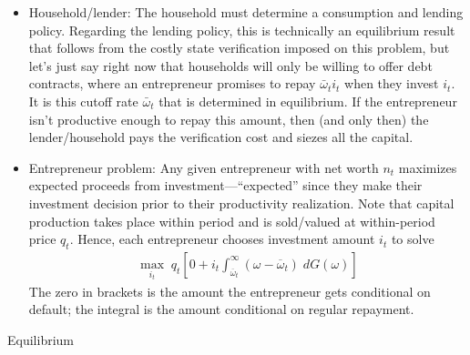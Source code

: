 \documentclass[12pt]{article}
\theoremstyle{plain}
\theoremstyle{definition}
\theoremstyle{remark}
\begin{document}
\begin{itemize}
  \item Household/lender:
    The household must determine a consumption and lending policy.
    Regarding the lending policy, this is technically an equilibrium
    result that follows from the costly state verification imposed on
    this problem, but let's just say right now that households will only
    be willing to offer debt contracts, where an entrepreneur promises
    to repay $\bar{\omega}_ti_t$ when they invest $i_t$. It is this
    cutoff rate $\bar{\omega}_t$ that is determined in equilibrium.
    If the entrepreneur isn't productive enough to repay this amount,
    then (and only then) the lender/household pays the verification cost
    and siezes all the capital.

  \item Entrepreneur problem:
    Any given entrepreneur with net worth $n_t$ maximizes expected
    proceeds from investment---``expected'' since they make their
    investment decision prior to their productivity realization.
    Note that capital production takes place within period and is
    sold/valued at within-period price $q_t$.
    Hence, each entrepreneur chooses investment amount $i_t$ to solve
    \begin{align*}
      \max_{i_t}
      \;
      q_t
      \left[
      0 +
      i_t\int_{\overline{\omega}_t}^\infty
      (\omega-\overline{\omega}_t)\;dG(\omega)
      \right]
    \end{align*}
    The zero in brackets is the amount the entrepreneur gets
    conditional on default; the integral is the amount conditional on
    regular repayment.
\end{itemize}
Equilibrium
\end{document}
